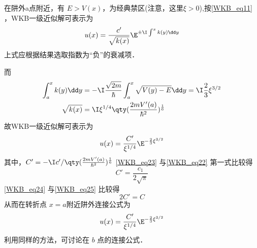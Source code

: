 在阱外a点附近，有 $E>V(x)$，为经典禁区(注意，这里$\xi>0$),按\autoref{WKB_eq11} ，WKB一级近似解可表示为
\begin{equation}
u(x)=\frac{c'}{\sqrt{k(x)}}\E^{\pm \I\int^xk(y)\dd y}
\end{equation}
上式应根据结果选取指数为“负”的衰减项．

而
\begin{equation}
\begin{aligned}
\int_a^xk(y)\dd y&=
-\I\frac{\sqrt{2m}}{\hbar}\int_a^x\sqrt{V(y)-E}\dd y=\I\frac{2}{3}\xi^{3/2}
\\
\sqrt{k(x)}
&=
\I\xi^{1/4}\qty(\frac{2mV'(a)}{\hbar^2})^{\frac{1}{6}}
\end{aligned}
\end{equation}
故WKB一级近似解可表示为
\begin{equation}
u(x)=\frac{C'}{\xi^{1/4}}\E^{-\frac{2}{3}\xi^{3/2}}
\end{equation}
其中，$C'=-\I c'/\qty(\frac{2mV'(a)}{\hbar^2})^{\frac{1}{6}}$
\autoref{WKB_eq23} 与\autoref{WKB_eq22} 第一式比较得
\begin{equation}\label{WKB_eq24}
C'=\frac{c_1}{2\sqrt{\pi}}
\end{equation}
\autoref{WKB_eq24} 与\autoref{WKB_eq25} 比较得
\begin{equation}
2C'=C
\end{equation}
从而在转折点 $x=a$附近阱外连接公式为
\begin{equation}\label{WKB_eq23}
u(x)=\frac{C'}{\xi^{1/4}}\E^{-\frac{2}{3}\xi^{3/2}}
\end{equation}
利用同样的方法，可讨论在 $b$ 点的连接公式．
